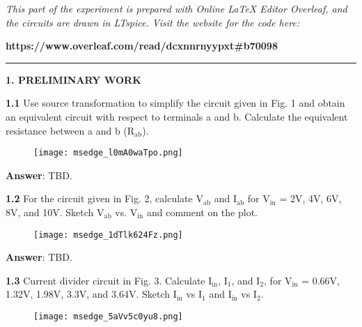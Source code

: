 \documentclass{article}
\begin{document}
\large

{\textit{This part of the experiment is prepared with Online LaTeX Editor Overleaf, and the circuits are drawn in LTspice. Visit the website for the code here:}}

{\textbf{https://www.overleaf.com/read/dcxnnrnyypxt\#b70098}}
\vspace{4mm}
\hrule
\vspace{4mm}
{\Large \textbf{1. PRELIMINARY WORK}}

\vspace{4mm}



{\textbf{1.1} Use source transformation to simplify the circuit given in Fig. 1 and obtain an 
equivalent circuit with respect to terminals a and b. Calculate the equivalent resistance 
between a and b (R$_{\text{ab}}$).}

\begin{figure}[H]
    \centering
    \texttt{[image: msedge\_l0mA0waTpo.png]}
\end{figure}

\vspace{4mm}

{\textbf{Answer}: TBD.}

\vspace{8mm}

{\textbf{1.2} For the circuit given in Fig. 2, calculate V$_{\text{ab}}$ and I$_{\text{ab}}$ for V$_{\text{in}}$ = 2V, 4V, 6V, 8V, and 10V. Sketch V$_{\text{ab}}$ vs. V$_{\text{in}}$ and comment on the plot.}

\begin{figure}[H]
    \centering
    \texttt{[image: msedge\_1dTlk624Fz.png]}
\end{figure}

\vspace{4mm}

{\textbf{Answer}: TBD.}

\vspace{8mm}

{\textbf{1.3} Current divider circuit in Fig. 3. Calculate I$_{\text{in}}$,  I$_1$, and I$_2$, for V$_{\text{in}}$ = 0.66V, 1.32V, 1.98V, 3.3V, and 3.64V. Sketch I$_{\text{in}}$ vs I$_1$ and I$_{\text{in}}$ vs I$_2$.}

\begin{figure}[H]
    \centering
    \texttt{[image: msedge\_5aVv5c0yu8.png]}
\end{figure}
\end{document}
